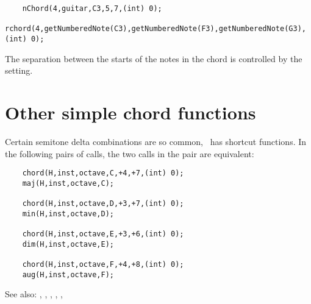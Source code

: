 \documentclass{article}
\begin{document}
\begin{verbatim}
    nChord(4,guitar,C3,5,7,(int) 0);
    rchord(4,getNumberedNote(C3),getNumberedNote(F3),getNumberedNote(G3),(int) 0);
\end{verbatim}

The separation between the starts of the notes in the chord is
controlled by the  setting.

\section*{Other simple chord functions}

Certain semitone delta combinations are so common, \songlib\ has shortcut
functions. In the following pairs of calls, the two calls in the pair
are equivalent:

\begin{verbatim}
    chord(H,inst,octave,C,+4,+7,(int) 0);
    maj(H,inst,octave,C);

    chord(H,inst,octave,D,+3,+7,(int) 0);
    min(H,inst,octave,D);

    chord(H,inst,octave,E,+3,+6,(int) 0);
    dim(H,inst,octave,E);

    chord(H,inst,octave,F,+4,+8,(int) 0);
    aug(H,inst,octave,F);
\end{verbatim}

See also: , ,
,
,
,
\end{document}
